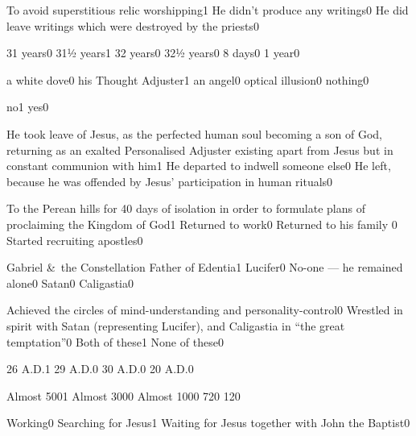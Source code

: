 {To avoid superstitious relic worshipping}{1}
{He didn't produce any writings}{0}
{He did leave writings which were destroyed by the priests}{0}
\qstop

{31 years}{0}
{31½ years}{1}
{32 years}{0}
{32½ years}{0}
{8 days}{0}
{1 year}{0}
\qstop

{a white dove}{0}
{his Thought Adjuster}{1}
{an angel}{0}
{optical illusion}{0}
{nothing}{0}
\qstop

{no}{1}
{yes}{0}
\qstop

{He took leave of Jesus, as the perfected human soul becoming a son of God, returning as an exalted Personalised Adjuster existing apart from Jesus but in constant communion with him}{1}
{He departed to indwell someone else}{0}
{He left, because he was offended by Jesus' participation in human rituals}{0}
\qstop

{To the Perean hills for 40 days of isolation in order to formulate plans of proclaiming the Kingdom of God}{1}
{Returned to work}{0}
{Returned to his family }{0}
{Started recruiting apostles}{0}
\qstop

{Gabriel \&\ the Constellation Father of Edentia}{1}
{Lucifer}{0}
{No-one --- he remained alone}{0}
{Satan}{0}
{Caligastia}{0}
\qstop

{Achieved the circles of mind-understanding and per\-so\-na\-li\-ty\hyp{}control}{0}
{Wrestled in spirit with Satan (representing Lucifer), and Caligastia in ``the great temptation''}{0}
{Both of these}{1}
{None of these}{0}
\qstop

{26 A.D.}{1}
{29 A.D.}{0}
{30 A.D.}{0}
{20 A.D.}{0}
\qstop

{Almost 500}{1}
{Almost 300}{0}
{Almost 100}{0}
{72}{0}
{12}{0}
\qstop

{Working}{0}
{Searching for Jesus}{1}
{Waiting for Jesus together with John the Baptist}{0}
\qstop

